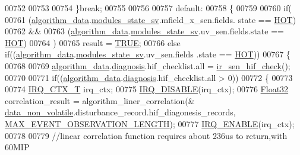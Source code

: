 \begin{DoxyCode}
00752 
00753 
00754                 \}\textcolor{keywordflow}{break};
00755 
00756 
00757                  \textcolor{keywordflow}{default}:
00758                 \{
00759 
00760                       \textcolor{keywordflow}{if}(
00761                         (\hyperlink{a00038_a183caa40cd01e79ee309cc9c4a225197}{algorithm\_data}.\hyperlink{a00016_a293140e240bbd54f7601adbc9194148c}{modules\_state\_sv}.mfield\_x\_sen.fields.
      state == \hyperlink{a00021_a1eb14cc432874ddacd1934791dbe12a3}{HOT})
00762                         &&
00763                         (\hyperlink{a00038_a183caa40cd01e79ee309cc9c4a225197}{algorithm\_data}.\hyperlink{a00016_a293140e240bbd54f7601adbc9194148c}{modules\_state\_sv}.uv\_sen.fields.state 
      == \hyperlink{a00021_a1eb14cc432874ddacd1934791dbe12a3}{HOT})
00764                         )
00765                             result = \hyperlink{a00040_aa8cecfc5c5c054d2875c03e77b7be15d}{TRUE};
00766                        \textcolor{keywordflow}{else} \textcolor{keywordflow}{if}((\hyperlink{a00038_a183caa40cd01e79ee309cc9c4a225197}{algorithm\_data}.\hyperlink{a00016_a293140e240bbd54f7601adbc9194148c}{modules\_state\_sv}.uv\_sen.fields
      .state == \hyperlink{a00021_a1eb14cc432874ddacd1934791dbe12a3}{HOT}))
00767                        \{
00768 
00769                            \hyperlink{a00038_a183caa40cd01e79ee309cc9c4a225197}{algorithm\_data}.\hyperlink{a00016_a16f85d57ec98b4ad05f5a2e10536b3c6}{diagnosis}.hif\_checklist.all = 
      \hyperlink{a00017_a86870a0e00601a92277e689447739ce9}{ir\_sen\_hif\_check}();
00770 
00771                            \textcolor{keywordflow}{if}((\hyperlink{a00038_a183caa40cd01e79ee309cc9c4a225197}{algorithm\_data}.\hyperlink{a00016_a16f85d57ec98b4ad05f5a2e10536b3c6}{diagnosis}.hif\_checklist.all > 0))
00772                            \{
00773 
00774                                \hyperlink{a00033_a6d4f0a7397640f5b011ca9c39d47dc72}{IRQ\_CTX\_T}   irq\_ctx;
00775                                \hyperlink{a00033_a357168bbe78739811cdb7b5576714ca6}{IRQ\_DISABLE}(irq\_ctx);
00776                                  \hyperlink{a00072_a87d38f886e617ced2698fc55afa07637}{Float32} correlation\_result = algorithm\_liner\_correlation(&
      \hyperlink{a00060_a76ac5f917f5308dcd83de0d7c94559fb}{data\_non\_volatile}.disturbance\_record.hif\_diagonesis\_records,
      \hyperlink{a00022_aa060aeb1ecb530b3c6f6d91060999b70}{MAX\_EVENT\_OBSERVATION\_LENGTH});
00777                                \hyperlink{a00033_abc8e0f43382f8b0fdf60d35a93c20c57}{IRQ\_ENABLE}(irq\_ctx);
00778                                
00779                                \textcolor{comment}{//linear correlation function requires about 236us to return,with 60MIP}

\end{DoxyCode}
